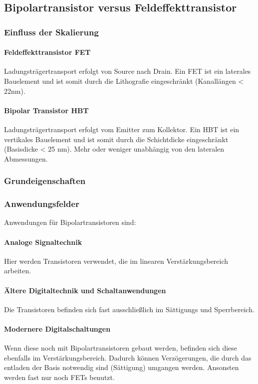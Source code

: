 \subsection{Bipolartransistor versus Feldeffekttransistor}
	\subsubsection{Einfluss der Skalierung}
	\paragraph{Feldeffekttransistor FET}
	Ladungsträgertransport erfolgt von Source
	nach Drain. Ein FET ist ein laterales Bauelement und ist somit durch die Lithografie eingeschränkt (Kanallängen < 22nm).
	
	\paragraph{Bipolar Transistor HBT}
	Ladungsträgertransport erfolgt vom Emitter
	zum Kollektor. Ein HBT ist ein vertikales Bauelement und ist somit durch die Schichtdicke eingeschränkt (Basisdicke < 25 nm). Mehr oder weniger unabhängig von den lateralen Abmessungen.
	\subsubsection{Grundeigenschaften}
	\subsubsection{Anwendungsfelder}
	Anwendungen für Bipolartransistoren sind:
	\paragraph{Analoge Signaltechnik} Hier werden Transistoren verwendet, die im linearen Verstärkungsbereich arbeiten.
	\paragraph{Ältere Digitaltechnik und Schaltanwendungen} Die Transistoren befinden sich fast ausschließlich  im Sättigungs und Sperrbereich.
	\paragraph{Modernere Digitalschaltungen} Wenn diese noch mit Bipolartransistoren gebaut werden, befinden sich diese ebenfalls im Verstärkungsbereich. Dadurch können Verzögerungen, die durch das entladen der Basis notwendig sind (Sättigung) umgangen werden. Ansonsten werden fast nur noch FETs benutzt. 
